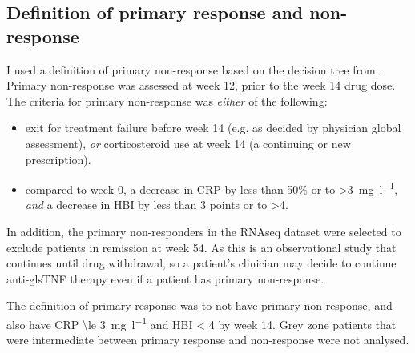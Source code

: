 \begin{outline}
\subsection{Definition of primary response and non-response}
\label{multiPANTS:PR_definition}

I used a definition of primary non-response based on the decision tree from \textcite{kennedy2019PredictorsAntiTNFTreatment}.
Primary non-response was assessed at week 12, prior to the week 14 drug dose. The criteria for primary non-response was \emph{either} of the following: 
\begin{itemize}
    \item exit for treatment failure before week 14 (e.g. as decided by physician global assessment), \emph{or} corticosteroid use at week 14 (a continuing or new prescription).
    \item compared to week 0, a decrease in \gls{CRP} by less than 50\% or to >\SI{3}{\milli\gram\per\litre}, \emph{and} a decrease in \gls{HBI} by less than 3 points or to >4.
\end{itemize}
In addition, the primary non-responders in the \gls{RNAseq} dataset were selected to exclude patients in remission at week 54.
As this is an observational study that continues until drug withdrawal, so a patient's clinician may decide to continue anti-gls{TNF} therapy even if a patient has primary non-response.

The definition of primary response was to not have primary non-response, and also have \gls{CRP} \SI{\le 3}{\milli\gram\per\litre} and \gls{HBI} < 4 by week 14.
Grey zone patients that were intermediate between primary response and non-response were not analysed.

%


\end{outline}
